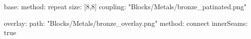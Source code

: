 base:
  method: repeat
  size: [8,8]
  coupling: "Blocks/Metals/bronze_patinated.png"
  
overlay:
  path: "Blocks/Metals/bronze_overlay.png"
  method: connect
  innerSeams: true